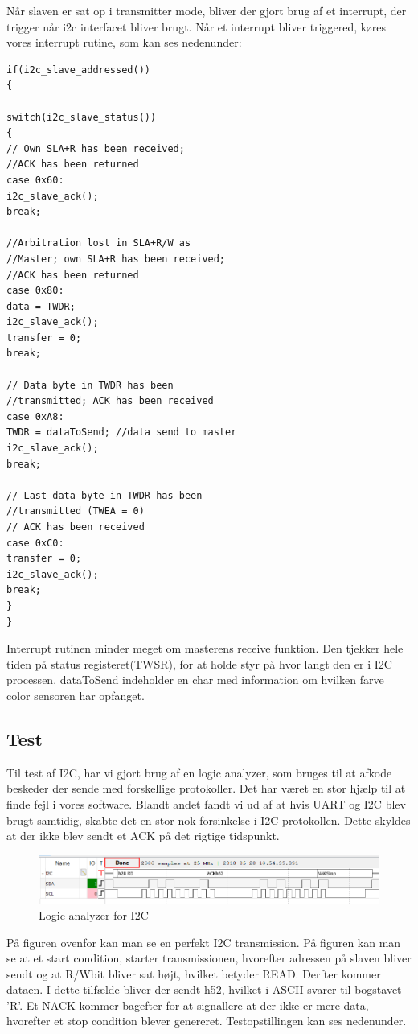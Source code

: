 Når slaven er sat op i transmitter mode, bliver der gjort brug af et interrupt, der trigger når i2c interfacet bliver brugt. Når et interrupt bliver triggered, køres vores interrupt rutine, som kan ses nedenunder:

\begin{lstlisting}
if(i2c_slave_addressed())
{

switch(i2c_slave_status())
{
// Own SLA+R has been received;
//ACK has been returned
case 0x60:
i2c_slave_ack();
break;

//Arbitration lost in SLA+R/W as
//Master; own SLA+R has been received;
//ACK has been returned
case 0x80:
data = TWDR;
i2c_slave_ack();
transfer = 0;
break;

// Data byte in TWDR has been
//transmitted; ACK has been received
case 0xA8:
TWDR = dataToSend; //data send to master
i2c_slave_ack();
break;

// Last data byte in TWDR has been
//transmitted (TWEA = 0)
// ACK has been received
case 0xC0:
transfer = 0;
i2c_slave_ack();
break;
}
}\end{lstlisting}

Interrupt rutinen minder meget om masterens receive funktion. Den tjekker hele tiden på status registeret(TWSR), for at holde styr på hvor langt den er i I2C processen. dataToSend indeholder en char med information om hvilken farve color sensoren har opfanget. 

\subsection{Test}
Til test af I2C, har vi gjort brug af en logic analyzer, som bruges til at afkode beskeder der sende med forskellige protokoller. Det har været en stor hjælp til at finde fejl i vores software. Blandt andet fandt vi ud af at hvis UART og I2C blev brugt samtidig, skabte det en stor nok forsinkelse i I2C protokollen. Dette skyldes at der ikke blev sendt et ACK på det rigtige tidspunkt. 

\begin{figure}[H]
	\centering
	\includegraphics[width = 450pt]{Img/I2C_logic.png}
	\caption{Logic analyzer for I2C}
	\label{fig:I2C_Logic}
\end{figure}

På figuren ovenfor kan man se en perfekt I2C transmission. På figuren kan man se at et start condition, starter transmissionen, hvorefter adressen på slaven bliver sendt og at R/Wbit bliver sat højt, hvilket betyder READ. Derfter kommer dataen. I dette tilfælde bliver der sendt h52, hvilket i ASCII svarer til bogstavet 'R'. Et NACK kommer bagefter for at signallere at der ikke er mere data, hvorefter et stop condition blever genereret. Testopstillingen kan ses nedenunder.

